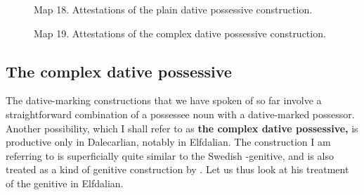 
\begin{figure}[h]

\begin{minipage}{4.23958in}

\label{bkm:Ref154557005}Map 18. Attestations of the plain dative possessive construction.


\end{minipage}

\end{figure}



\begin{figure}[h]

\begin{minipage}{3.9625in}

Map 19. Attestations of the complex dative possessive construction.


\end{minipage}

\end{figure}

\subsection{\rmfamily The complex dative possessive}
\label{bkm:Ref224373337}
The dative-marking constructions that we have spoken of so far involve a straightforward combination of a possessee noun with a dative-marked possessor. Another possibility, which I shall refer to as \textbf{the complex dative possessive,} is productive only in Dalecarlian, notably in Elfdalian. The construction I am referring to is superficially quite similar to the Swedish -genitive, and is also treated as a kind of genitive construction by \citet{Levander1909}. Let us thus look at his treatment of the genitive in Elfdalian.


